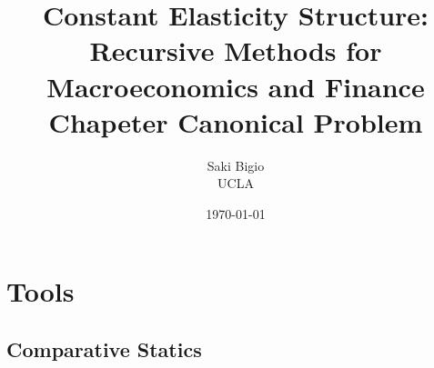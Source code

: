 \documentclass[12pt,openany]{book}
\title{Constant Elasticity Structure: \\ Recursive Methods for Macroeconomics and Finance \\ Chapeter Canonical Problem}
\author{Saki Bigio \\UCLA}
\date{\today}
\begin{document}
\frontmatter
\maketitle

\tableofcontents

\mainmatter

\part{Tools}
\label{part:tools}

\chapter{Comparative Statics}
\label{ch:ces-aggregators}



\backmatter


\end{document}
